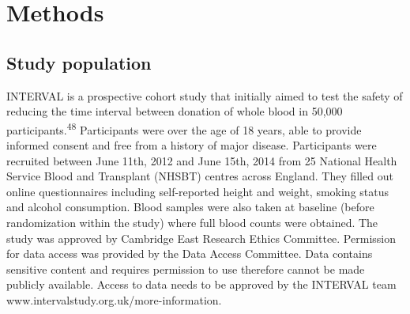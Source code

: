 \documentclass[11pt,twoside]{bristolthesis}
\begin{document}
\hypertarget{methods}{%
\section{Methods}\label{methods}}

\hypertarget{study-population}{%
\subsection{Study population}\label{study-population}}

INTERVAL is a prospective cohort study that initially aimed to test the safety of reducing the time interval between donation of whole blood in 50,000 participants.\textsuperscript{48} Participants were over the age of 18 years, able to provide informed consent and free from a history of major disease. Participants were recruited between June 11th, 2012 and June 15th, 2014 from 25 National Health Service Blood and Transplant (NHSBT) centres across England. They filled out online questionnaires including self-reported height and weight, smoking status and alcohol consumption. Blood samples were also taken at baseline (before randomization within the study) where full blood counts were obtained. The study was approved by Cambridge East Research Ethics Committee. Permission for data access was provided by the Data Access Committee. Data contains sensitive content and requires permission to use therefore cannot be made publicly available. Access to data needs to be approved by the INTERVAL team www.intervalstudy.org.uk/more-information.
\end{document}
